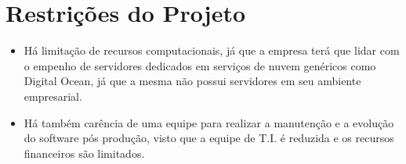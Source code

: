 \section{Restrições do Projeto}

  \begin{itemize}
    \item Há limitação de recursos computacionais, já que a empresa terá que lidar com o empenho de servidores dedicados em serviços de nuvem
      genéricos como Digital Ocean, já que a mesma não possui servidores em seu ambiente empresarial.
    \item Há também carência de uma equipe para realizar a manutenção e a evolução do software pós produção, visto que a equipe de T.I. é
      reduzida e os recursos financeiros são limitados.
  \end{itemize}

